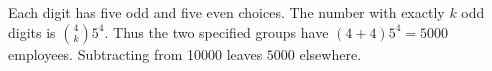 Each digit has five odd and five even choices. The number with exactly $k$ odd digits is $\binom4k5^4$. Thus the two specified groups have $(4+4)5^4=5000$ employees. Subtracting from 10000 leaves $\boxed{5000}$ elsewhere.
